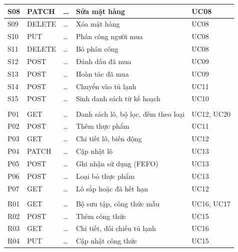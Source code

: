 {\begin{longtable}{|C{0.8cm}|C{1.8cm}|L{5.4cm}|L{\dimexpr{}\arrayrulewidth-0.8cm-1.8cm-5.4cm-1.85cm\relax}|C{1.85cm}|}
S08 & PATCH & \ldots{} & Sửa mặt hàng & UC08\\ \hline
S09 & DELETE & \ldots{} & Xóa mặt hàng & UC08\\ \hline
S10 & PUT & \ldots{} & Phân công người mua & UC08\\ \hline
S11 & DELETE & \ldots{} & Bỏ phân công & UC08\\ \hline
S12 & POST & \ldots{} & Đánh dấu đã mua & UC09\\ \hline
S13 & POST & \ldots{} & Hoàn tác đã mua & UC09\\ \hline
S14 & POST & \ldots{} & Chuyển vào tủ lạnh & UC11\\ \hline
S15 & POST & \ldots{} & Sinh danh sách từ kế hoạch & UC10\\ \hline
{}\\ \hline
P01 & GET & \ldots{} & Danh sách lô, bộ lọc, đếm theo loại & UC12, UC20\\ \hline
P02 & POST & \ldots{} & Thêm thực phẩm & UC11\\ \hline
P03 & GET & \ldots{} & Chi tiết lô, biến động & UC12\\ \hline
P04 & PATCH & \ldots{} & Cập nhật lô & UC13\\ \hline
P05 & POST & \ldots{} & Ghi nhận sử dụng (FEFO) & UC13\\ \hline
P06 & POST & \ldots{} & Loại bỏ thực phẩm & UC13\\ \hline
P07 & GET & \ldots{} & Lô sắp hoặc đã hết hạn & UC12\\ \hline
{}\\ \hline
R01 & GET & \ldots{} & Bộ sưu tập, công thức mẫu & UC16, UC17\\ \hline
R02 & POST & \ldots{} & Thêm công thức & UC15\\ \hline
R03 & GET & \ldots{} & Chi tiết, đối chiếu tủ lạnh & UC16\\ \hline
R04 & PUT & \ldots{} & Cập nhật công thức & UC15\\ \hline

\end{longtable}}
